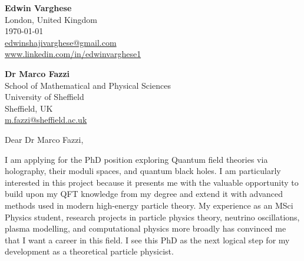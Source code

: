 \documentclass[11pt]{report}
\begin{document}
	\begin{titlepage}
		
		\begin{minipage}[t]{0.90\textwidth}
			\hfill
			\raggedleft
			\textbf{Edwin Varghese} \\
			London, United Kingdom \\
			\today\\
			\href{mailto:edwinshajivarghese@gmail.com}{edwinshajivarghese@gmail.com} \\
			\url{www.linkedin.com/in/edwinvarghese1}
		\end{minipage}
		
		\raggedright \textbf{Dr Marco Fazzi} \\ School of Mathematical and Physical Sciences \\ University of Sheffield \\ Sheffield, UK\\ \href{mailto:m.fazzi@sheffield.ac.uk}{m.fazzi@sheffield.ac.uk}\\
		
		\vspace{0.7em}
		
		\raggedright Dear Dr Marco Fazzi,\\
		\vspace{0.7em}
		
	I am applying for the PhD position exploring Quantum field theories via holography, their moduli spaces, and quantum black holes. I am particularly interested in this project because it presents me with the valuable opportunity to build upon my QFT knowledge from my degree and extend it with advanced methods used in modern high-energy particle theory. My experience as an MSci Physics student, research projects in particle physics theory, neutrino oscillations, plasma modelling, and computational physics more broadly has convinced me that I want a career in this field. I see this PhD as the next logical step for my development as a theoretical particle physicist. \\
		\vspace{0.7em}
		

\end{titlepage}
\end{document}

